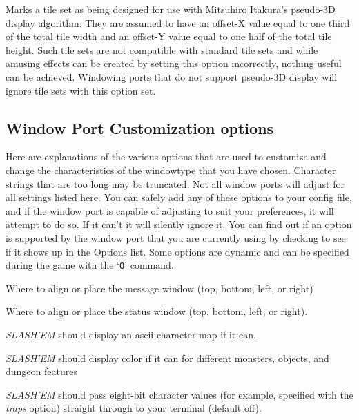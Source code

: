 \item[\ib{pseudo3D}]
Marks a tile set as being designed for use with Mitsuhiro Itakura's
pseudo-3D display algorithm. They are assumed to have an offset-X value
equal to one third of the total tile width and an offset-Y value equal
to one half of the total tile height. Such tile sets are not compatible
with standard tile sets and while amusing effects can be created by
setting this option incorrectly, nothing useful can be achieved. Windowing
ports that do not support pseudo-3D display will ignore tile sets with
this option set.
\elist
\nd %
\subsection*{Window Port Customization options}


Here are explanations of the various options that are
used to customize and change the characteristics of the
windowtype that you have chosen.
Character strings that are too long may be truncated.
Not all window ports will adjust for all settings listed
here.  You can safely add any of these options to your config
file, and if the window port is capable of adjusting to
suit your preferences, it will attempt to do so. If it
can't it will silently ignore it.  You can find out if an
option is supported by the window port that you are currently
using by checking to see if it shows up in the Options list.
Some options are dynamic and can be specified during the game
with the `{\tt O}' command.
\blist{}

\item[\ib{align\_message}]
Where to align or place the message window (top, bottom, left, or right)

\item[\ib{align\_status}]
Where to align or place the status window (top, bottom, left, or right).

\item[\ib{ascii\_map}]
{\it SLASH'EM\/} should display an ascii character map if it can.

\item[\ib{color		}]
{\it SLASH'EM\/} should display color if it can for different monsters, 
objects, and dungeon features

\item[\ib{eight\_bit\_tty	}]
{\it SLASH'EM\/} should pass eight-bit character values (for example, specified with the
{\it traps\/} 
option) straight through to your terminal (default off).

